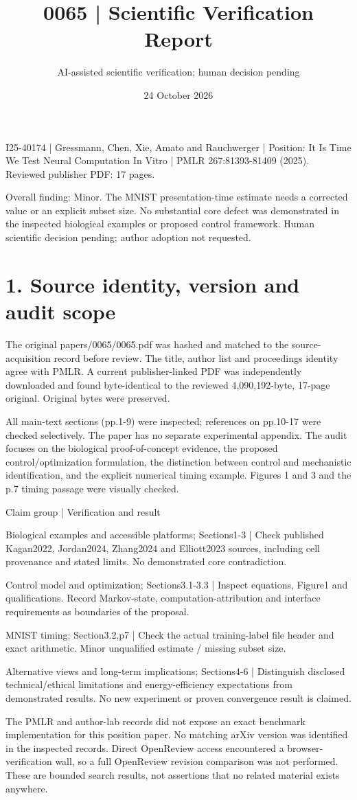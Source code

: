 \documentclass[10pt]{article}
\title{0065 | Scientific Verification Report}
\author{AI-assisted scientific verification; human decision pending}
\date{24 October 2026}
\begin{document}
\maketitle
I25-40174 | Gressmann, Chen, Xie, Amato and Rauchwerger | Position: It Is Time We Test Neural Computation In Vitro | PMLR 267:81393-81409 (2025). Reviewed publisher PDF: 17 pages.\par
Overall finding: Minor. The MNIST presentation-time estimate needs a corrected value or an explicit subset size. No substantial core defect was demonstrated in the inspected biological examples or proposed control framework. Human scientific decision pending; author adoption not requested.\par
\section*{1. Source identity, version and audit scope}
The original papers/0065/0065.pdf was hashed and matched to the source-acquisition record before review. The title, author list and proceedings identity agree with PMLR. A current publisher-linked PDF was independently downloaded and found byte-identical to the reviewed 4,090,192-byte, 17-page original. Original bytes were preserved.\par
All main-text sections (pp.1-9) were inspected; references on pp.10-17 were checked selectively. The paper has no separate experimental appendix. The audit focuses on the biological proof-of-concept evidence, the proposed control/optimization formulation, the distinction between control and mechanistic identification, and the explicit numerical timing example. Figures 1 and 3 and the p.7 timing passage were visually checked.\par
Claim group | Verification and result\par
Biological examples and accessible platforms; Sections1-3 | Check published Kagan2022, Jordan2024, Zhang2024 and Elliott2023 sources, including cell provenance and stated limits. No demonstrated core contradiction.\par
Control model and optimization; Sections3.1-3.3 | Inspect equations, Figure1 and qualifications. Record Markov-state, computation-attribution and interface requirements as boundaries of the proposal.\par
MNIST timing; Section3.2,p7 | Check the actual training-label file header and exact arithmetic. Minor unqualified estimate / missing subset size.\par
Alternative views and long-term implications; Sections4-6 | Distinguish disclosed technical/ethical limitations and energy-efficiency expectations from demonstrated results. No new experiment or proven convergence result is claimed.\par
The PMLR and author-lab records did not expose an exact benchmark implementation for this position paper. No matching arXiv version was identified in the inspected records. Direct OpenReview access encountered a browser-verification wall, so a full OpenReview revision comparison was not performed. These are bounded search results, not assertions that no related material exists anywhere.\par
\end{document}
